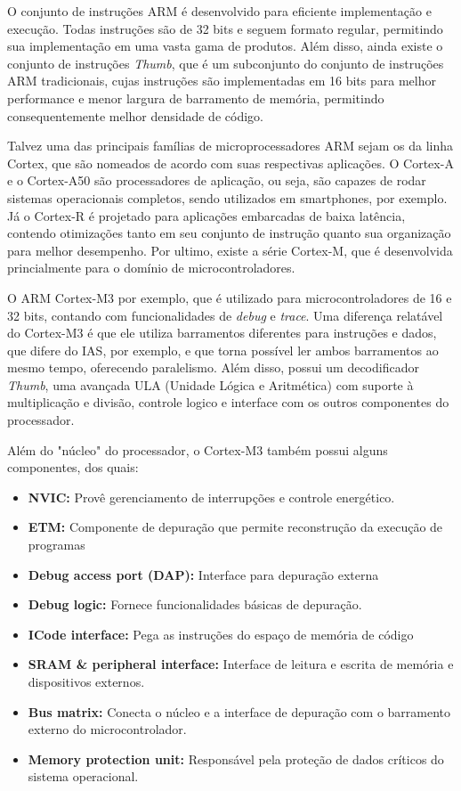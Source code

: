 \documentclass{article}
\begin{document}
O conjunto de instruções ARM é desenvolvido para eficiente implementação e
execução. Todas instruções são de 32 bits e seguem formato regular, permitindo
sua implementação em uma vasta gama de produtos. Além disso, ainda existe o
conjunto de instruções \textit{Thumb}, que é um subconjunto do conjunto de
instruções ARM tradicionais, cujas instruções são implementadas em 16 bits para
melhor performance e menor largura de barramento de memória, permitindo
consequentemente melhor densidade de código.

Talvez uma das principais famílias de microprocessadores ARM sejam os da linha
Cortex, que são nomeados de acordo com suas respectivas aplicações. O Cortex-A
e o Cortex-A50 são processadores de aplicação, ou seja, são capazes de rodar sistemas
operacionais completos, sendo utilizados em smartphones, por exemplo. Já o
Cortex-R é projetado para aplicações embarcadas de baixa latência, contendo
otimizações tanto em seu conjunto de instrução quanto sua organização para
melhor desempenho. Por ultimo, existe a série Cortex-M, que é desenvolvida
princialmente para o domínio de microcontroladores.

O ARM Cortex-M3 por exemplo, que é utilizado para microcontroladores de 16 e 32
bits, contando com funcionalidades de \textit{debug} e \textit{trace}. Uma
diferença relatável do Cortex-M3 é que ele utiliza barramentos diferentes para
instruções e dados, que difere do IAS, por exemplo, e que torna possível ler
ambos barramentos ao mesmo tempo, oferecendo paralelismo. Além disso, possui um
decodificador \textit{Thumb}, uma avançada ULA (Unidade Lógica e Aritmética)
com suporte à multiplicação e divisão, controle logico e interface com os outros
componentes do processador.

Além do "núcleo" do processador, o Cortex-M3 também possui alguns componentes,
dos quais:

\begin{itemize}
    \item \textbf{NVIC:} Provê gerenciamento de interrupções e controle
        energético.
    \item \textbf{ETM:} Componente de depuração que permite reconstrução da
        execução de programas
    \item \textbf{Debug access port (DAP):} Interface para depuração externa
    \item \textbf{Debug logic:} Fornece funcionalidades básicas de depuração.
    \item \textbf{ICode interface:} Pega as instruções do espaço de memória de
        código
    \item \textbf{SRAM \& peripheral interface:} Interface de leitura e escrita
        de memória e dispositivos externos.
    \item \textbf{Bus matrix:} Conecta o núcleo e a interface de depuração com
        o barramento externo do microcontrolador.
    \item \textbf{Memory protection unit:} Responsável pela proteção de dados
        críticos do sistema operacional. 
\end{itemize}
\end{document}
